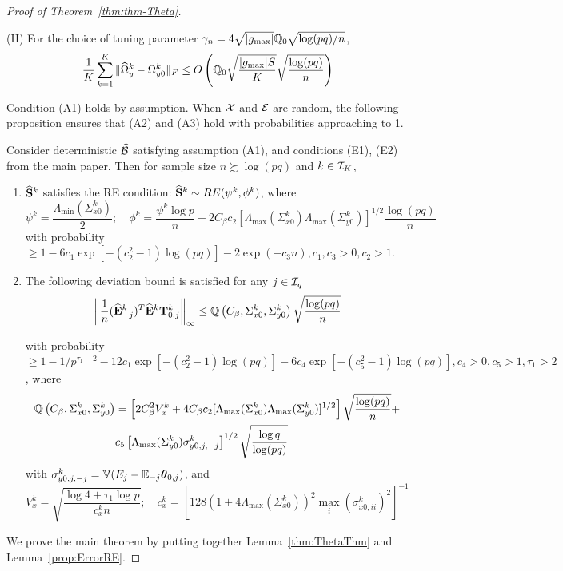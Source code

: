 \begin{proof}[Proof of Theorem~\ref{thm:thm-Theta}]
\begin{Lemma}
\noindent (II) For the choice of tuning parameter $\gamma_n = 4 \sqrt{| g_{\max}|} {\mathbb{Q}}_0 \sqrt{\log (p q)/n}$,
%
\begin{align}\label{eqn:OmegaBounds0a}
\frac{1}{K} \sum_{k=1}^K \| \widehat \Omega_y^k - \Omega_{y0}^k \|_F \leq
O \left( {\mathbb{Q}}_0 \sqrt{\frac{| g_{\max}| S}{K}}
\sqrt {\frac{ \log (p q)}{n}} \right)
\end{align}
%
%
\end{Lemma}

Condition (A1) holds by assumption. When ${\cal{X}}$ and ${\cal{E}}$ are random, the following proposition ensures that (A2) and (A3) hold with probabilities approaching to 1.

\begin{Lemma}\label{prop:ErrorRE}
Consider deterministic $\widehat {{\cal{B}}}$ satisfying assumption (A1), and conditions (E1), (E2) from the main paper. Then for sample size $n \succsim \log (pq)$ and $k \in {\cal{I}}_K$,

\begin{enumerate}
\item $\widehat {{\mathbf{S}}}^k$ satisfies the RE condition: $ \widehat {{\mathbf{S}}}^k \sim RE (\psi^k, \phi^k)$, where 
%
$$
\psi^k = \frac{ \Lambda_{\min} (\Sigma_{x0}^k)}{2}; \quad \phi^k = \frac{ \psi^k \log p}{n} + 2 C_\beta c_2 [ \Lambda_{\max} (\Sigma_{x0}^k) \Lambda_{\max} (\Sigma_{y0}^k) ]^{1/2} \frac{ \log(pq)}{n}
$$
%
with probability $\geq 1 - 6c_1 \exp [-(c_2^2-1) \log(pq)] - 2 \exp (- c_3 n), c_1, c_3 > 0, c_2 > 1$.
%
\item The following deviation bound is satisfied for any $j \in {\cal{I}}_q$
%
$$
\left\|\frac{1}{n} (\widehat {{\mathbf{E}}}_{-j}^k)^T \widehat {{\mathbf{E}}}^k {\mathbf{T}}_{0,j}^k \right\|_\infty \leq {\mathbb{Q}} \left(C_\beta, \Sigma_{x0}^k, \Sigma_{y0}^k \right) \sqrt {\frac{ \log (p q)}{n}}
$$
%

with probability $\geq 1 - 1/p^{\tau_1-2} - 12 c_1 \exp [-(c_2^2-1) \log(pq)] - 6c_4 \exp [-(c_5^2-1) \log(pq)], c_4 > 0, c_5 > 1, \tau_1 > 2$, where
%
\begin{align*}
{\mathbb{Q}} \left(C_\beta, \Sigma_{x0}^k, \Sigma_{y0}^k \right) &=
\left[ 2 C_\beta^2 V_x^k + 4 C_\beta c_2 [ \Lambda_{\max} (\Sigma_{x0}^k) \Lambda_{\max} (\Sigma_{y0}^k) ]^{1/2} \right] \sqrt{\frac{ \log(pq)}{n}} +\\
& c_5 \left[ \Lambda_{\max} ( \Sigma_{y0}^k) \sigma_{y0,j,-j}^k \right]^{1/2} \sqrt{\frac{\log q}{\log (pq)}}
\end{align*}
%
with $\sigma_{y0,j,-j}^k = {\mathbb{V}}( E_j - {\mathbb{E}}_{-j} {\boldsymbol{\theta}}_{0,j})$, and 
%
$$
V_x^k = \sqrt{ \frac{ \log 4 + \tau_1 \log p}{c_x^k n}}; \quad
c_x^k = \left[ 128 ( 1 + 4 \Lambda_{\max} (\Sigma_{x0}^k)  )^2 \max_i (\sigma_{x0,ii}^k)^2 \right]^{-1}
$$
\end{enumerate} 
\end{Lemma}

\noindent We prove the main theorem by putting together Lemma~\ref{thm:ThetaThm} and Lemma~\ref{prop:ErrorRE}.
\end{proof}

